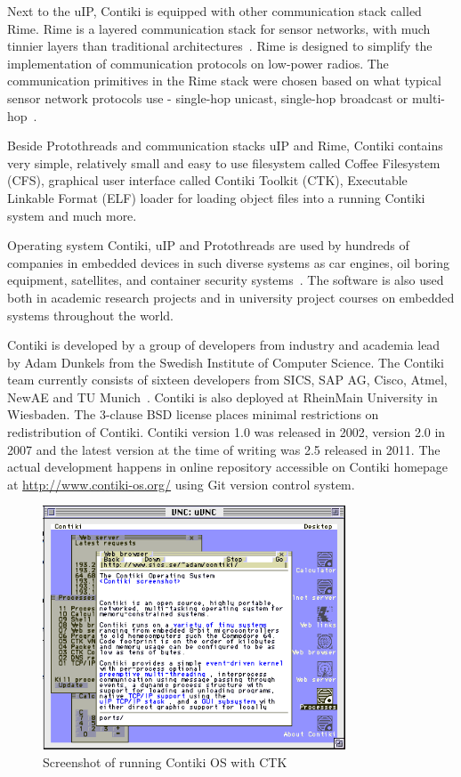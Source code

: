 Next to the uIP, Contiki is equipped with other communication stack called Rime.
Rime is a layered communication stack for sensor networks,
with much tinnier layers than traditional architectures~\cite{paper-rime}.
Rime is designed to simplify the implementation of communication
protocols on low-power radios.
The communication primitives in the Rime stack were chosen
based on what typical sensor network protocols use -
single-hop unicast, single-hop broadcast or multi-hop~\cite{contiki-docs,paper-rime}.

Beside Protothreads and communication stacks uIP and Rime,
Contiki contains very simple, relatively small and easy to use filesystem
called Coffee Filesystem (CFS),
graphical user interface called Contiki Toolkit (CTK),
Executable Linkable Format (ELF) loader for loading object files into a running Contiki system
and much more.

Operating system Contiki, uIP and Protothreads are used by hundreds of companies in embedded devices in
such diverse systems as car engines, oil boring equipment, satellites, and container security systems~\cite{thesis-programming}.
The software is also used both in academic research
projects and in university project courses on embedded systems throughout the
world.

Contiki is developed by a group of developers from industry and academia
lead by Adam Dunkels from the Swedish Institute of Computer Science.
The Contiki team currently consists of sixteen developers from SICS,
SAP AG, Cisco, Atmel, NewAE and TU Munich~\cite{contiki-docs}.
Contiki is also deployed at RheinMain University in Wiesbaden.
The 3-clause BSD license places minimal restrictions on redistribution of Contiki.
Contiki version 1.0 was released in 2002, version 2.0 in 2007 and the latest version
at the time of writing was 2.5 released in 2011.
The actual development happens in online repository accessible on Contiki homepage at \url{http://www.contiki-os.org/}
using Git version control system.

\begin{figure}
  \centering
  \includegraphics[width=9cm,keepaspectratio]{fig/contiki-vnc.png}
  \caption{Screenshot of running Contiki OS with CTK}
  \label{fig:contiki}
  \bigskip
\end{figure}









